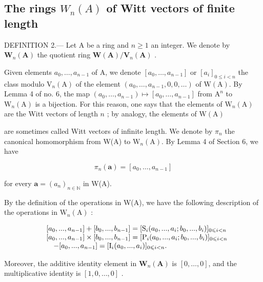 \subsection{\texorpdfstring{The rings \(W_{n}(A)\) of Witt vectors of finite length}{The rings W\_\{n\}(A) of Witt vectors of finite length}}

DEFINITION 2.--- Let A be a ring and \(n \geqslant 1\) an integer. We denote by \(\mathbf{W}_{n}(\mathbf{A})\) the quotient ring \(\mathbf{W}(\mathbf{A}) / \mathbf{V}_{n}(\mathbf{A})\) .

Given elements \(a_0, \ldots, a_{n-1}\) of A, we denote \([a_0, \ldots, a_{n-1}]\) or \([a_i]_{0 \leq i < n}\) the class modulo \(\mathrm{V}_n(\mathrm{A})\) of the element \((a_0, \ldots, a_{n-1}, 0, 0, \ldots)\) of \(\mathrm{W}(\mathrm{A})\). By Lemma 4 of no. 6, the map \((a_0, \ldots, a_{n-1}) \mapsto [a_0, \ldots, a_{n-1}]\) from \(\mathrm{A}^n\) to \(\mathrm{W}_n(\mathrm{A})\) is a bijection. For this reason, one says that the elements of \(\mathrm{W}_n(\mathrm{A})\) are the Witt vectors of length \(n\) ; by analogy, the elements of \(\mathrm{W}(\mathrm{A})\)

are sometimes called Witt vectors of infinite length. We denote by \(\pi_n\) the canonical homomorphism from W(A) to \(\mathrm{W}_n(\mathrm{A})\). By Lemma 4 of Section 6, we have

\[
\pi_ {n} (\boldsymbol {a}) = [ a _ {0}, \dots , a _ {n - 1} ]\tag{42}
\]

for every \(\boldsymbol{a} = (a_{n})_{n \in \mathbb{N}}\) in W(A).

By the definition of the operations in W(A), we have the following description of the operations in \(\mathrm{W}_{n}(\mathrm{A})\) :

\[
\begin{array}{r l} & {[ a _ {0},..., a _ {n - 1} ] + [ b _ {0},..., b _ {n - 1} ] = [ \mathrm{S} _ {i} (a _ {0},..., a _ {i}; b _ {0},..., b _ {i}) ] _ {0 \leqslant i <   n}} \\ & {[ a _ {0},..., a _ {n - 1} ] \times [ b _ {0},..., b _ {n - 1} ] = [ \mathrm{P} _ {i} (a _ {0},..., a _ {i}; b _ {0},..., b _ {i}) ] _ {0 \leqslant i <   n}} \\ & {\quad - [ a _ {0},..., a _ {n - 1} ] = [ \mathrm{I} _ {i} (a _ {0},..., a _ {i}) ] _ {0 \leqslant i <   n}.} \end{array}
\]

Moreover, the additive identity element in \(\mathbf{W}_{n}(\mathbf{A})\) is \([0,\dots,0]\), and the multiplicative identity is \([1,0,\dots,0]\) .

